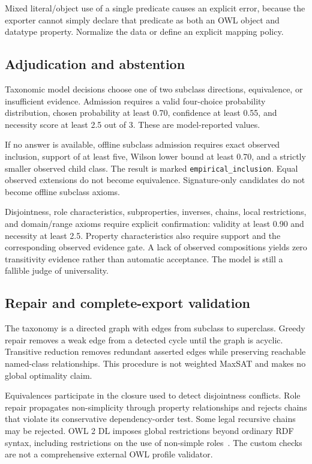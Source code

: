 \documentclass[11pt,a4paper]{article}
\newcommand{\code}[1]{\nolinkurl{#1}}
\begin{document}
Mixed literal/object use of a single predicate causes an explicit error, because
the exporter cannot simply declare that predicate as both an OWL object and
datatype property. Normalize the data or define an explicit mapping policy.

\subsection{Adjudication and abstention}
Taxonomic model decisions choose one of two subclass directions, equivalence,
or insufficient evidence. Admission requires a valid four-choice probability
distribution, chosen probability at least 0.70, confidence at least 0.55, and
necessity score at least 2.5 out of 3. These are model-reported values.

If no answer is available, offline subclass admission requires exact observed
inclusion, support of at least five, Wilson lower bound at least 0.70, and a
strictly smaller observed child class. The result is marked
\code{empirical_inclusion}. Equal observed extensions do not become equivalence.
Signature-only candidates do not become offline subclass axioms.

Disjointness, role characteristics, subproperties, inverses, chains, local
restrictions, and domain/range axioms require explicit confirmation: validity
at least 0.90 and necessity at least 2.5. Property characteristics also require
support and the corresponding observed evidence gate. A lack of observed
compositions yields zero transitivity evidence rather than automatic acceptance.
The model is still a fallible judge of universality.

\subsection{Repair and complete-export validation}
The taxonomy is a directed graph with edges from subclass to superclass. Greedy
repair removes a weak edge from a detected cycle until the graph is acyclic.
Transitive reduction removes redundant asserted edges while preserving reachable
named-class relationships. This procedure is not weighted MaxSAT and makes no
global optimality claim.

Equivalences participate in the closure used to detect disjointness conflicts.
Role repair propagates non-simplicity through property relationships and rejects
chains that violate its conservative dependency-order test. Some legal recursive
chains may be rejected. OWL 2 DL imposes global restrictions beyond ordinary RDF
syntax, including restrictions on the use of non-simple roles~\cite{owl-syntax}.
The custom checks are not a comprehensive external OWL profile validator.
\end{document}
